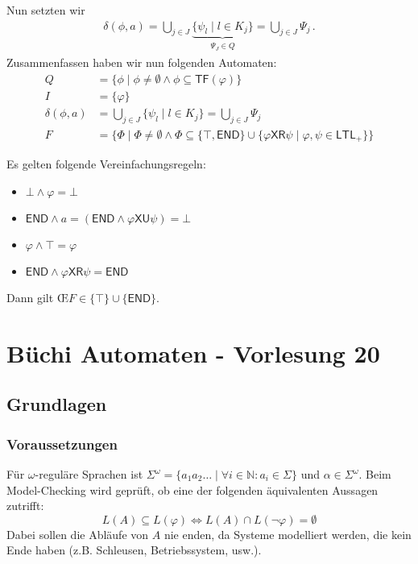 \documentclass[12pt, german]{article}
\newcommand{\N}{\mathbb{N}}
\newcommand{\pom}{^{\omega}}
\newcommand{\ltl}{\mathsf{LTL}}
\newcommand{\sX}{\mathsf{X}}
\newcommand{\sU}{\mathsf{U}}
\newcommand{\sR}{\mathsf{R}}
\newcommand{\sende}{\mathsf{END}}
\newcommand{\tf}{\mathsf{TF}}
\newcommand{\oei}{\OE\hspace{2pt}}
\begin{document}
	Nun setzten wir
	\begin{align*}
		\delta(\phi, a) = \bigcup_{j \in J} \underbrace{\{\psi_l \mid l \in K_j\} }_{\substack{\Psi_J \in Q}}= \bigcup_{j\in J} \Psi_j\, .
	\end{align*}
	Zusammenfassen haben wir nun folgenden Automaten:
	\begin{align*}
		Q &= \{\phi \mid \phi \not = \emptyset \land \phi \subseteq \tf(\varphi)\} \\
		I &= \{\varphi\} \\
		\delta(\phi, a) &= \bigcup_{j \in J} \{\psi_l \mid l \in K_j\} = \bigcup_{j\in J} \Psi_j \\
		F &= \{\Phi \mid \Phi \not = \emptyset \land \Phi \subseteq \{\top, \sende \} \cup \{\varphi\sX\sR\psi \mid \varphi, \psi \in \ltl_+\}\}
	\end{align*}
	\newline
	
	Es gelten folgende Vereinfachungsregeln:
	\begin{itemize}
		\item $\bot \land \varphi = \bot$
		\item $\sende \land a = (\sende \land \varphi\sX\sU\psi) = \bot$
		\item $\varphi \land \top = \varphi$
		\item $\sende \land \varphi \sX\sR\psi = \sende$
	\end{itemize}
	
	Dann gilt \oei $F \in \{\top\} \cup \{\sende\}$.
	
\section{Büchi Automaten - Vorlesung 20}
\subsection{Grundlagen}
\subsubsection{Voraussetzungen}
 Für $\omega$-reguläre Sprachen ist $\Sigma\pom = \{a_1a_2\ldots \mid \forall i \in \N: a_i \in \Sigma \}$ und $\alpha \in \Sigma\pom$. 
 Beim Model-Checking wird geprüft, ob eine der folgenden äquivalenten Aussagen zutrifft: $$L(A) \subseteq L(\varphi) \iff L(A) \cap L(\neg \varphi) = \emptyset$$
 Dabei sollen die Abläufe von $A$ nie enden, da Systeme modelliert werden, die kein Ende haben (z.B. Schleusen, Betriebssystem, usw.).
\end{document}
